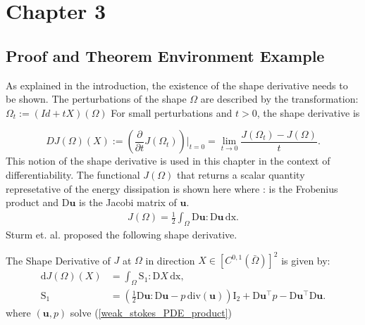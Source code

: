 \section{Chapter 3}
\subsection{Proof and Theorem Environment Example}

As explained in the introduction, the existence of the shape derivative needs to be shown.
The perturbations of the shape $\Omega$ are described by the transformation: $\Omega_t := (Id + tX )(\Omega)$ 
For small perturbations and $t > 0$, the shape derivative is \cite{fully_semi_paper_sturm}

\begin{equation}\label{shape_derrivative_t_limit}
	DJ(\Omega)(X) := \left(\frac{\partial}{\partial t}J(\Omega_t)\right)\bigg\rvert_{t=0} = \lim_{t \to 0} \frac{J(\Omega_t)-J(\Omega)}{t}.
\end{equation}
This notion of the shape derivative is used in this chapter in the context of differentiability. The functional $J(\Omega)$ that returns a scalar quantity 
represetative of the energy dissipation is shown here where : is the Frobenius product and $\mathrm{D} \mathbf{u}$ is the Jacobi matrix of $\mathbf{u}$.
\begin{align}\label{energy_dissipation_equation}
	J(\Omega) = \frac{1}{2} \int_{\Omega} \mathrm{D} \mathbf{u} : \mathrm{D} \mathbf{u} \, \mathrm{dx}.
\end{align}
Sturm et. al. \cite{nearly_conformal_paper} proposed the following shape derivative. \\
\begin{theorem*}
The Shape Derivative of $J$ at $\Omega$ in direction $ X \in [C^{0,1}(\bar{\Omega})]^2 $ is given by:
\begin{align}\label{shape_derivative_S1}
	\mathrm{d}J(\Omega)(X) &= \int_{\Omega} \mathrm{S}_1 : \mathrm{D}X \, \mathrm{dx}, \\
	\mathrm{S}_1 &= \left( \frac{1}{2}\mathrm{D} \mathbf{u} : \mathrm{D} \mathbf{u} - p \, \mathrm{div}(\mathbf{u}) \right)
	\mathrm{I}_2 + \mathrm{D} \mathbf{u}^{\top}p - \mathrm{D} \mathbf{u}^{\top} \mathrm{D} \mathbf{u}.
\end{align}
where $(\mathbf{u},p)$ solve (\ref*{weak_stokes_PDE_product})
\end{theorem*}
